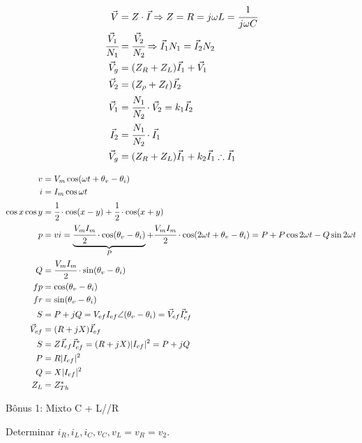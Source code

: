 \documentclass[12pt,a4paper]{article}
\begin{document}
\begin{align}
\vec V &= Z \cdot \vec I \Rightarrow Z = R = j\omega L = \cfrac{1}{j \omega C} \\
\cfrac{\vec V_1}{N_1} &= \cfrac{\vec V_2}{N_2} \Rightarrow \vec I_1 N_1 = \vec I_2 N_2 \\
\vec V_g &= (Z_R + Z_L) \vec I_1 + \vec V_1 \\
\vec V_2 &= (Z_{\rho} + Z_{\ell}) \vec I_2 \\
\vec V_1 &= \cfrac{N_1}{N_2} \cdot \vec V_2 = k_1 \vec I_2 \\
\vec I_2 &= \cfrac{N_1}{N_2}\cdot \vec I_1 \\
\vec V_g &= (Z_R + Z_L) \vec I_1 + k_2 \vec I_1 \therefore \vec I_1
\end{align}

\begin{align}
v &= V_m \cos (\omega t + \theta_v - \theta_i) \\
i &= I_m \cos \omega t \\
\cos x \cos y &= \cfrac{1}{2}\cdot \cos(x - y) + \cfrac{1}{2}\cdot \cos(x + y) \\
p &= vi =  \underbrace{\cfrac{V_m I_m}{2}\cdot \cos(\theta_v - \theta_i)}_P + \cfrac{V_m I_m}{2}\cdot \cos(2\omega t + \theta_v - \theta_i) = P + P \cos 2 \omega t - Q \sin 2 \omega t \\
Q &= \cfrac{V_m I_m}{2}\cdot \sin(\theta_v - \theta_i) \\
fp &= \cos(\theta_v - \theta_i) \\
fr &= \sin(\theta_v - \theta_i) \\
S &= P + jQ = V_{ef} I_{ef} \angle (\theta_v - \theta_i) = \vec V_{ef} \vec I_{ef}^* \\
\vec V_{ef} &= (R + jX) \vec I_{ef} \\
S &= Z \vec I_{ef} \vec I_{ef}^* = (R + jX) |I_{ef}|^2 = P + jQ \\
P &= R |I_{ef}|^2 \\
Q &= X |I_{ef}|^2 \\
Z_L &= Z_{Th}^*
\end{align}

\Large

B\^onus 1: Mixto C + L//R

\normalsize

Determinar $i_R, i_L, i_C, v_C, v_L = v_R = v_2$.
\end{document}
